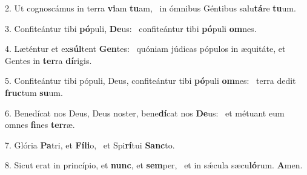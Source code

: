 2. Ut cognoscámus in terra \textbf{vi}am \textbf{tu}am, \ast\  in ómnibus Géntibus salu\textbf{tá}re \textbf{tu}um.\

3. Confiteántur tibi \textbf{pó}puli, \textbf{De}us: \ast\  confiteántur tibi \textbf{pó}puli \textbf{om}nes.\

4. Læténtur et ex\textbf{súl}tent \textbf{Gen}tes: \ast\  quóniam júdicas pópulos in æquitáte, et Gentes in \textbf{ter}ra \textbf{dí}rigis.\

5. Confiteántur tibi pópuli, Deus, confiteántur tibi \textbf{pó}puli \textbf{om}nes: \ast\  terra dedit \textbf{fruc}tum \textbf{su}um.\

6. Benedícat nos Deus, Deus noster, bene\textbf{dí}cat nos \textbf{De}us: \ast\  et métuant eum omnes \textbf{fi}nes \textbf{ter}ræ.\

7. Glória \textbf{Pa}tri, et \textbf{Fí}\textbf{li}o, \ast\  et Spi\textbf{rí}tui \textbf{Sanc}to.\

8. Sicut erat in princípio, et \textbf{nunc}, et \textbf{sem}per, \ast\  et in sǽcula sæcu\textbf{ló}rum. \textbf{A}men.\

